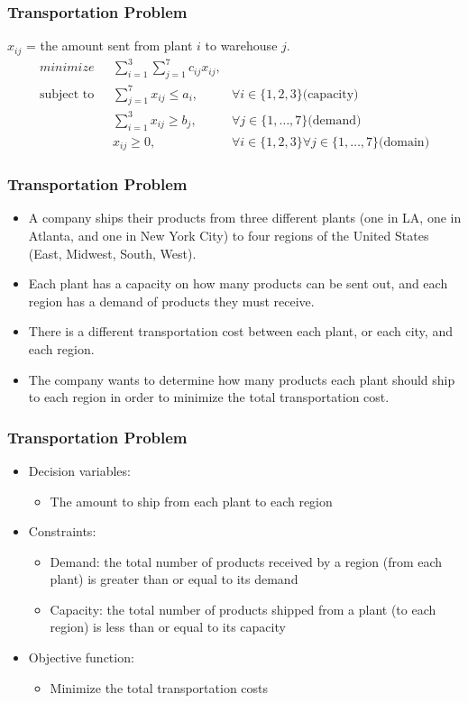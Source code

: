 \documentclass[11pt]{beamer}
\begin{document}
\begin{frame}
\frametitle{Transportation Problem}
$x_{ij}$ = the amount sent from plant $i$ to warehouse $j$.
\pause
\begin{align}
\displaystyle minimize \mbox{ } & \sum_{i=1}^{3} \sum_{j=1}^{7} c_{ij} x_{ij}, \label{transport:objective} \\
% 
\mbox{subject to }&\sum_{j=1}^{7} x_{ij} \leq a_i, & \forall i \in\{1,2,3\} \mbox{(capacity)}  \label{transport:capacity}\\
&\sum_{i=1}^{3} x_{ij} \geq b_j, & \forall j \in\{1,\ldots,7\} \mbox{(demand)}  \label{transport:demand}\\
& x_{ij} \geq 0, &\forall i \in\{1,2,3\} \forall j \in\{1,\ldots,7\} \mbox{(domain)} \label{transport:domain}
\end{align}

\end{frame}


\begin{frame}
\frametitle{Transportation Problem}
\begin{itemize}
\item A company ships their products from three different plants (one in LA, one in Atlanta, and one in New York City) to four regions of the United States (East, Midwest, South, West).
\item Each plant has a capacity on how many products can be sent out, and each region has a demand of products they must receive.
\item There is a different transportation cost between each plant, or each city, and each region.
\item The company wants to determine how many products each plant should ship to each region in order to minimize the total transportation cost.
\end{itemize}

\end{frame}


\begin{frame}
\frametitle{Transportation Problem}
\begin{itemize}
\item Decision variables:
\begin{itemize}
\item The amount to ship from each plant to each region
\end{itemize}
\item Constraints:
\begin{itemize}
\item Demand: the total number of products received by a region (from each plant) is greater than or equal to its demand
\item Capacity: the total number of products shipped from a plant (to each region) is less than or equal to its capacity
\end{itemize}
\item Objective function:
\begin{itemize}
\item Minimize the total transportation costs
\end{itemize}
\end{itemize}

\end{frame}
\end{document}
